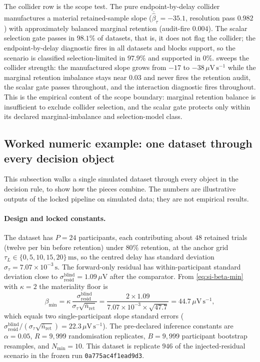 \documentclass[11pt,a4paper]{article}
\theoremstyle{definition}
\newcommand{\tauL}{\tau_L}
\begin{document}
The collider row is the scope test. The pure endpoint-by-delay collider manufactures
a material retained-sample slope (\(\overline{\widehat\beta}_\tau=-35.1\), resolution
pass \(0.982\)) with approximately balanced marginal retention (audit-fire \(0.004\)).
The scalar selection gate passes in \(98.1\%\) of datasets, that is, it does not
flag the collider; the endpoint-by-delay diagnostic fires in all datasets and
blocks support, so the scenario is classified selection-limited in \(97.9\%\) and
supported in \(0\%\).  sweeps the collider strength: the
manufactured slope grows from \(-17\) to \(-38\,\mu\mathrm{V\,s^{-1}}\) while the
marginal retention imbalance stays near \(0.03\) and never fires the retention
audit, the scalar gate passes throughout, and the interaction diagnostic fires
throughout. This is the empirical content of the scope boundary: marginal retention
balance is insufficient to exclude collider selection, and the scalar gate protects
only within its declared marginal-imbalance and selection-model class.



\subsection{Worked numeric example: one dataset through every decision object}
\label{sec:si-worked-example}

This subsection walks a single simulated dataset through every object in the
decision rule, to show how the pieces combine. The numbers are illustrative
outputs of the locked pipeline on simulated data; they are not empirical results.

\paragraph{Design and locked constants.} The dataset has \(P=24\) participants,
each contributing about \(48\) retained trials (twelve per bin before retention)
under \(80\%\) retention, at the anchor grid
\(\tauL\in\{0,5,10,15,20\}\,\mathrm{ms}\), so the centred delay has standard
deviation \(\sigma_\tau=7.07\times10^{-3}\,\mathrm{s}\).
The forward-only residual has within-participant standard deviation close to
\(\sigma_{\mathrm{resid}}^{\mathrm{blind}}=1.09\,\mu\mathrm{V}\) after the
comparator. From \eqref{eq:si-beta-min} with \(\kappa=2\) the materiality floor is
\begin{equation*}
\beta_{\min}
=\kappa\,\frac{\sigma_{\mathrm{resid}}^{\mathrm{blind}}}
{\sigma_\tau\sqrt{\bar n_{\mathrm{ret}}}}
=\frac{2\times1.09}{7.07\times10^{-3}\times\sqrt{47.7}}
=44.7\,\mu\mathrm{V\,s^{-1}},
\end{equation*}
which equals two single-participant slope standard errors
(\(\sigma_{\mathrm{resid}}^{\mathrm{blind}}/(\sigma_\tau\sqrt{\bar n_{\mathrm{ret}}})
=22.3\,\mu\mathrm{V\,s^{-1}}\)). The pre-declared inference constants are
\(\alpha=0.05\), \(R=9{,}999\) randomisation replicates, \(B=9{,}999\) participant
bootstrap resamples, and \(N_{\min}=10\). This dataset is replicate \(946\) of the
injected-residual scenario in the frozen run \texttt{0a775ac4f1ead9d3}.
\end{document}
